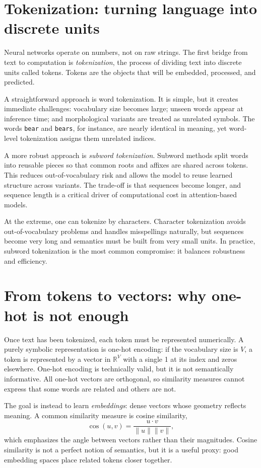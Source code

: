 \section{Tokenization: turning language into discrete units}
Neural networks operate on numbers, not on raw strings. The first bridge from text to computation is \emph{tokenization}, the process of dividing text into discrete units called tokens. Tokens are the objects that will be embedded, processed, and predicted.

A straightforward approach is word tokenization. It is simple, but it creates immediate challenges: vocabulary size becomes large; unseen words appear at inference time; and morphological variants are treated as unrelated symbols. The words \texttt{bear} and \texttt{bears}, for instance, are nearly identical in meaning, yet word-level tokenization assigns them unrelated indices.

A more robust approach is \emph{subword tokenization}. Subword methods split words into reusable pieces so that common roots and affixes are shared across tokens. This reduces out-of-vocabulary risk and allows the model to reuse learned structure across variants. The trade-off is that sequences become longer, and sequence length is a critical driver of computational cost in attention-based models.

At the extreme, one can tokenize by characters. Character tokenization avoids out-of-vocabulary problems and handles misspellings naturally, but sequences become very long and semantics must be built from very small units. In practice, subword tokenization is the most common compromise: it balances robustness and efficiency.

\section{From tokens to vectors: why one-hot is not enough}
Once text has been tokenized, each token must be represented numerically. A purely symbolic representation is one-hot encoding: if the vocabulary size is $V$, a token is represented by a vector in $\mathbb{R}^V$ with a single 1 at its index and zeros elsewhere. One-hot encoding is technically valid, but it is not semantically informative. All one-hot vectors are orthogonal, so similarity measures cannot express that some words are related and others are not.

The goal is instead to learn \emph{embeddings}: dense vectors whose geometry reflects meaning. A common similarity measure is cosine similarity,
\[
\cos(u,v)=\frac{u\cdot v}{\|u\|\|v\|},
\]
which emphasizes the angle between vectors rather than their magnitudes. Cosine similarity is not a perfect notion of semantics, but it is a useful proxy: good embedding spaces place related tokens closer together.

